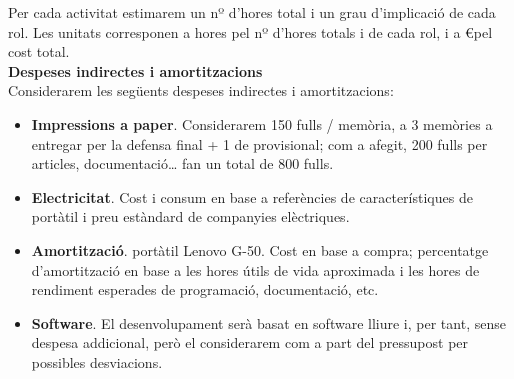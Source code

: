 Per cada activitat estimarem un nº d’hores total i un grau d’implicació de cada rol. Les unitats corresponen a hores pel nº d’hores totals i de cada rol, i a \euro pel cost total.\\

\noindent \textbf{\large Despeses indirectes i amortitzacions}\\

\noindent Considerarem les següents despeses indirectes i amortitzacions:

\begin{itemize}
\item \textbf{Impressions a paper}. Considerarem 150 fulls / memòria, a 3 memòries a entregar per la defensa final + 1 de provisional; com a afegit, 200 fulls per articles, documentació… fan un total de 800 fulls.
\item \textbf{Electricitat}. Cost i consum en base a referències de característiques de portàtil i preu estàndard de companyies elèctriques.
\item \textbf{Amortització}. portàtil Lenovo G-50. Cost en base a compra; percentatge d’amortització en base a les hores útils de vida aproximada i les hores de rendiment esperades de programació, documentació, etc.
\item \textbf{Software}. El desenvolupament serà basat en software lliure i, per tant, sense despesa addicional, però el considerarem com a part del pressupost per possibles desviacions.
\end{itemize}

\begin{table}[htb]
\centering
\label{PressupostIndirectes}
\caption{Costos indirectes i amortitzacions}
\end{table}



